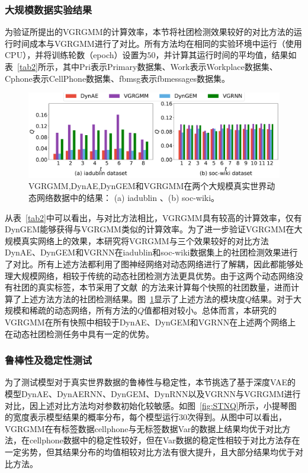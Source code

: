 \subsubsection{大规模数据实验结果}
为验证所提出的VGRGMM的计算效率，本节将社团检测效果较好的对比方法的运行时间成本与VGRGMM进行了对比。所有方法均在相同的实验环境中运行（使用CPU），并将训练轮数（epoch）设置为$50$，并计算其运行时间的平均值，结果如表~\ref{tab2}所示，其中Pri表示Primary数据集、Work表示Workplace数据集、Cphone表示CellPhone数据集、fbmsg表示fbmessages数据集。
\begin{figure}
    \centering
    \includegraphics[width=.8\textwidth]{figures/chap06/bigdata-ia-soc.pdf}
    \caption{VGRGMM,DynAE,DynGEM和VGRGMM在两个大规模真实世界动态网络数据中的结果： (a) iadublin 、(b) soc-wiki。}
    \label{fig:iadublin}
\end{figure}


从表~\ref{tab2}中可以看出，与对比方法相比，VGRGMM具有较高的计算效率，仅有DynGEM能够获得与VGRGMM类似的计算效率。为了进一步验证VGRGMM在大规模真实网络上的效果，本研究将VGRGMM与三个效果较好的对比方法DynAE、DynGEM和VGRNN在iadublin和soc-wiki数据集上的社团检测效果进行了对比。所有上述方法都利用了图神经网络对动态网络进行了解耦，因此都能够处理大规模网络，相较于传统的动态社团检测方法更具优势。由于这两个动态网络没有社团的真实标签，本节采用了文献~\cite{Krzakala.2013.Zhang}的方法来计算每个快照的社团数量，进而计算了上述方法方法的社团检测结果。图~\ref{fig:iadublin}显示了上述方法的模块度$Q$结果。对于大规模和稀疏的动态网络，所有方法的$Q$值都相对较小。总体而言，本研究的VGRGMM在所有快照中相较于DynAE、DynGEM和VGRNN在上述两个网络上在动态社团检测任务中具有一定的优势。

%

\subsubsection{鲁棒性及稳定性测试}
为了测试模型对于真实世界数据的鲁棒性与稳定性，本节挑选了基于深度VAE的模型DynAE、DynAERNN、DynGEM、DynRNN以及VGRNN与VGRGMM进行对比，因上述对比方法均对参数初始化较敏感。如图~\ref{fig:STNQ}所示，小提琴图的宽度表示模型结果的概率分布，每个模型运行$30$次得到。从图中可以看出，VGRGMM在有标签数据cellphone与无标签数据Var的数据上结果均优于对比方法，在cellphone数据中的稳定性较好，但在Var数据的稳定性相较于对比方法存在一定劣势，但其结果分布的均值相较对比方法有很大提升，且大部分结果均优于对比方法。

